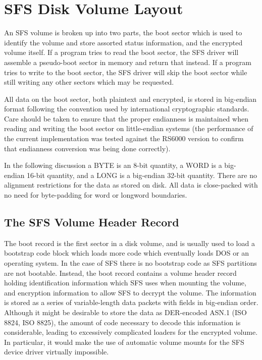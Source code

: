 
%


\section{SFS Disk Volume Layout}

An SFS volume is broken up into two parts, the boot sector which is used to
identify the volume and store assorted status information, and the encrypted
volume itself.  If a program tries to read the boot sector, the SFS driver will
assemble a pseudo-boot sector in memory and return that instead.  If a program
tries to write to the boot sector, the SFS driver will skip the boot sector
while still writing any other sectors which may be requested.

All data on the boot sector, both plaintext and encrypted, is stored in
big-endian format following the convention used by international cryptographic
standards.  Care should be taken to ensure that the proper endianness is
maintained when reading and writing the boot sector on little-endian systems
(the performance of the current implementation was tested against the RS6000
version to confirm that endianness conversion was being done correctly).

In the following discussion a BYTE is an 8-bit quantity, a WORD is a big-
endian 16-bit quantity, and a LONG is a big-endian 32-bit quantity.  There are
no alignment restrictions for the data as stored on disk.  All data is
close-packed with no need for byte-padding for word or longword boundaries.


\subsection{The SFS Volume Header Record}

The boot record is the first sector in a disk volume, and is usually used to
load a bootstrap code block which loads more code which eventually loads DOS or
an operating system.  In the case of SFS there is no bootstrap code as SFS
partitions are not bootable.  Instead, the boot record contains a volume header
record holding identification information which SFS uses when mounting the
volume, and encryption information to allow SFS to decrypt the volume.  The
information is stored as a series of variable-length data packets with fields
in big-endian order.  Although it might be desirable to store the data as
DER-encoded ASN.1 (ISO 8824, ISO 8825), the amount of code necessary to decode
this information is considerable, leading to excessively complicated loaders
for the encrypted volume.  In particular, it would make the use of automatic
volume mounts for the SFS device driver virtually impossible.

